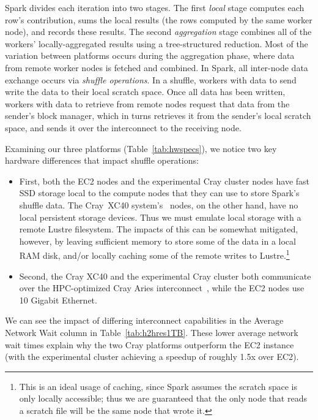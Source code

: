 Spark divides each iteration into two stages.  The first \emph{local}
stage computes each row's contribution, sums the local results (the
rows computed by the same worker node), and records these %
results.  The second \emph{aggregation} stage combines all of the workers' locally-aggregated results using a tree-structured reduction.  Most of the variation between platforms occurs during the aggregation phase, where data from remote worker nodes is fetched and combined.  In Spark, all inter-node data exchange occurs via \emph{shuffle operations}.  In a shuffle, workers with data to send write the data to their local scratch space.  Once all data has been written, workers with data to retrieve from remote nodes request that data from the sender's block manager, which in turns retrieves it from the sender's local scratch space, and sends it over the interconnect to the receiving node.

Examining our three platforms (Table~\ref{tab:hwspecs}), we notice two key hardware differences that impact shuffle operations:
\begin{itemize}
\item First, both the EC2 nodes and the experimental Cray cluster nodes have fast SSD storage local to the compute nodes that they can use to store Spark's shuffle data.  
  The Cray{\textsuperscript{\tiny\textregistered}}~XC40{\textsuperscript{\tiny\texttrademark}} system's~\cite{alverson2012cray,craycascadesc12} nodes, on the other hand, have no local persistent storage devices.  Thus we must emulate local storage with a remote Lustre filesystem.  The impacts of this can be somewhat mitigated, however, by leaving sufficient memory to store some of the data in a local RAM disk, and/or locally caching some of the remote writes to Lustre.\footnote{This is an ideal usage of caching, since Spark assumes the scratch space is only locally accessible; thus we are guaranteed that the only node that reads a scratch file will be the same node that wrote it.}
\item Second, the Cray XC40 and the experimental Cray cluster both communicate over the HPC-optimized Cray Aries 
interconnect~\cite{alverson2012cray,craycascadesc12}, while the EC2 nodes use 10 Gigabit Ethernet.
\end{itemize}  
We can see the impact of differing interconnect capabilities in the Average Network Wait column in Table~\ref{tab:h2hres1TB}.   These lower average network wait times explain why the two Cray platforms outperform the EC2 instance (with the experimental cluster achieving a speedup of roughly 1.5x over EC2).  

